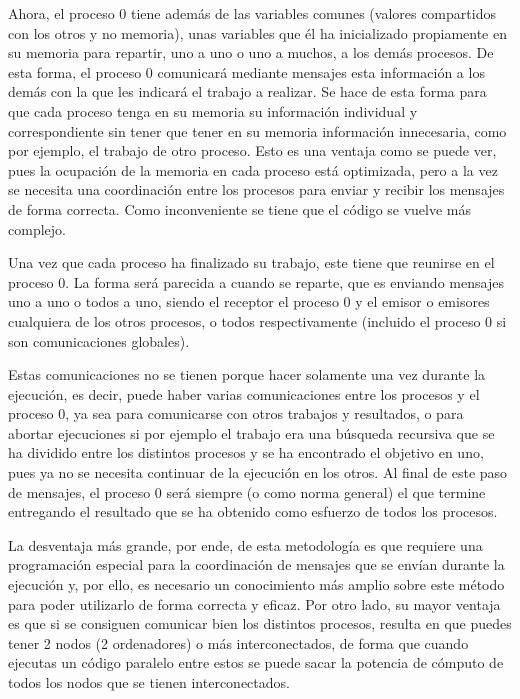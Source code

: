 \documentclass[a4paper,12pt]{article}
\begin{document}
Ahora, el proceso 0 tiene además de las variables comunes (valores compartidos con los otros y no memoria), unas variables que él ha inicializado propiamente en su memoria para repartir, uno a uno o uno a muchos, a los demás procesos. De esta forma, el proceso 0 comunicará mediante mensajes esta información a los demás con la que les indicará el trabajo a realizar. Se hace de esta forma para que cada proceso tenga en su memoria su información individual y correspondiente sin tener que tener en su memoria información innecesaria, como por ejemplo, el trabajo de otro proceso. Esto es una ventaja como se puede ver, pues la ocupación de la memoria en cada proceso está optimizada, pero a la vez se necesita una coordinación entre los procesos para enviar y recibir los mensajes de forma correcta. Como inconveniente se tiene que el código se vuelve más complejo. 

Una vez que cada proceso ha finalizado su trabajo, este tiene que reunirse en el proceso 0. La forma será parecida a cuando se reparte, que es enviando mensajes uno a uno o todos a uno, siendo el receptor el proceso 0 y el emisor o emisores cualquiera de los otros procesos, o todos respectivamente (incluido el proceso 0 si son comunicaciones globales).

Estas comunicaciones no se tienen porque hacer solamente una vez durante la ejecución, es decir, puede haber varias comunicaciones entre los procesos y el proceso 0, ya sea para comunicarse con otros trabajos y resultados, o para abortar ejecuciones si por ejemplo el trabajo era una búsqueda recursiva que se ha dividido entre los distintos procesos y se ha encontrado el objetivo en uno, pues ya no se necesita continuar de la ejecución en los otros. Al final de este paso de mensajes, el proceso 0 será siempre (o como norma general) el que termine entregando el resultado que se ha obtenido como esfuerzo de todos los procesos.

La desventaja más grande, por ende, de esta metodología es que requiere una programación especial para la coordinación de mensajes que se envían durante la ejecución y, por ello, es necesario un conocimiento más amplio sobre este método para poder utilizarlo de forma correcta y eficaz. Por otro lado, su mayor ventaja es que si se consiguen comunicar bien los distintos procesos, resulta en que puedes tener 2 nodos (2 ordenadores) o más interconectados, de forma que cuando ejecutas un código paralelo entre estos se puede sacar la potencia de cómputo de todos los nodos que se tienen interconectados.
\end{document}
